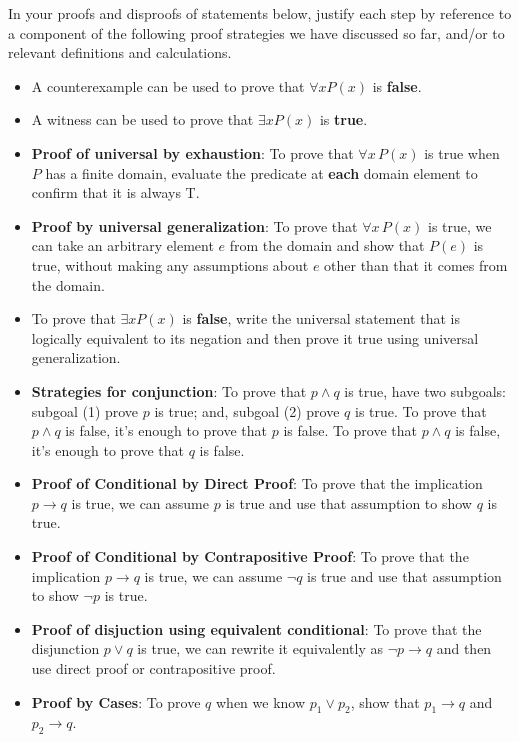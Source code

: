 \newpage
In your proofs and disproofs of statements below, justify each  step
by reference to  a component of the  following proof  strategies
we  have discussed so far, and/or to relevant definitions and calculations.
\begin{itemize}
    \item A counterexample can be used to prove that  $\forall x P(x)$ is {\bf false}.
    \item  A witness can be used to prove that  $\exists x P(x)$ is {\bf true}.
    \item {\bf Proof of universal by exhaustion}: To prove that $\forall x \, P(x)$
is true when $P$ has a finite domain, evaluate the predicate at {\bf each} domain element to confirm that it is always T.
    \item  {\bf Proof by universal generalization}: To prove that $\forall x \, P(x)$
is true, we can take an arbitrary element $e$ from the domain and show that $P(e)$ is true, without making any assumptions 
about $e$ other than that it comes from the domain.
    \item To  prove  that $\exists x P(x)$ is {\bf false}, write the universal statement that is 
    logically equivalent to its negation and then prove it true using universal generalization.
    \item {\bf Strategies for conjunction}: To prove that $p \land q$ is true, have two subgoals: 
    subgoal (1) prove $p$ 
is  true; and, subgoal (2) prove $q$ is true. To prove that $p \land q$ is false, it's enough to prove that $p$ is false.
 To prove that $p \land q$ is false, it's enough to prove that $q$ is false.
    \item {\bf Proof of Conditional by Direct Proof}: To prove that the implication $p \to q$ is true, 
    we can assume $p$ is true and use that assumption to show $q$ is true.
    \item {\bf Proof of Conditional by Contrapositive Proof}: To prove that the implication $p \to q$ is true, 
    we can assume $\neg q$ is true and use that assumption to show $\neg p$ is true.
    \item {\bf Proof of disjuction using equivalent conditional}: To prove that the 
    disjunction $p \lor q$ is true, we can rewrite it equivalently as $\lnot p \to q$ and
    then use direct proof or contrapositive proof.
    \item {\bf Proof by Cases}: To prove $q$ when we know $p_1 \lor p_2$, show that $p_1 \to q$ and $p_2 \to q$.
\end{itemize}

